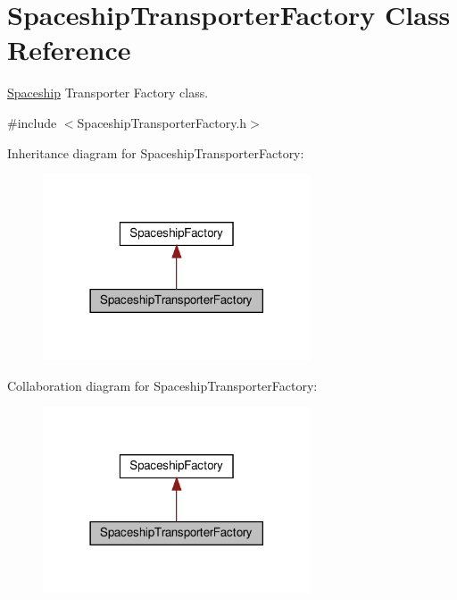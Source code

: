 \hypertarget{classSpaceshipTransporterFactory}{}\section{Spaceship\+Transporter\+Factory Class Reference}
\label{classSpaceshipTransporterFactory}


\hyperlink{classSpaceship}{Spaceship} Transporter Factory class.  




{\ttfamily \#include $<$Spaceship\+Transporter\+Factory.\+h$>$}



Inheritance diagram for Spaceship\+Transporter\+Factory\+:\nopagebreak
\begin{figure}[H]
\begin{center}
\leavevmode
\includegraphics[width=225pt]{classSpaceshipTransporterFactory__inherit__graph}
\end{center}
\end{figure}


Collaboration diagram for Spaceship\+Transporter\+Factory\+:\nopagebreak
\begin{figure}[H]
\begin{center}
\leavevmode
\includegraphics[width=225pt]{classSpaceshipTransporterFactory__coll__graph}
\end{center}
\end{figure}
